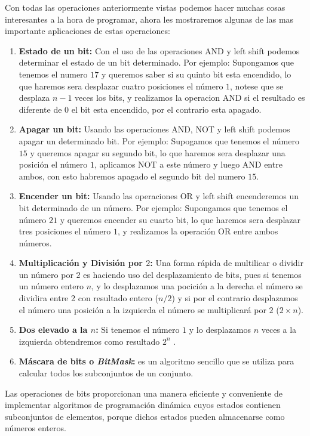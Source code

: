 Con todas las operaciones anteriormente vistas podemos hacer muchas cosas interesantes a la hora de
programar, ahora les mostraremos algunas de las mas importante aplicaciones de estas operaciones:

\begin{enumerate}
	\item \textbf{Estado de un bit:} Con el uso de las operaciones AND y left shift podemos determinar el estado de un bit determinado.
Por ejemplo: Supongamos que tenemos el numero $17$ y queremos saber si su quinto bit esta
encendido, lo que haremos sera desplazar cuatro posiciones el número $1$, notese que se desplaza $n-1$ veces los bits, y realizamos la operacion AND si el resultado es diferente de $0$ el bit esta encendido, por el contrario esta apagado.
	\item \textbf{Apagar un bit:} Usando las operaciones AND, NOT y left shift podemos apagar un determinado bit. Por ejemplo: Supogamos que tenemos el número $15$ y queremos apagar su segundo bit, lo que haremos sera
desplazar una posición el número $1$, aplicamos NOT a este número y luego AND entre ambos, con
esto habremos apagado el segundo bit del numero $15$.
	\item \textbf{Encender un bit:} Usando las operaciones OR y left shift encenderemos un bit determinado de un número. Por ejemplo: Supongamos que tenemos el número $21$ y queremos encender su cuarto bit, lo que haremos sera
desplazar tres posiciones el número $1$, y realizamos la operación OR entre ambos números.
	\item \textbf{Multiplicación y División por $2$:} Una forma rápida de multilicar o dividir un número por $2$ es haciendo uso del desplazamiento de
bits, pues si tenemos un número entero $n$, y lo desplazamos una pocición a la derecha el número se
dividira entre 2 con resultado entero ($n/2$) y si por el contrario desplazamos el número una posición
	a la izquierda el número se multiplicará por $2$ ($2 \times n$).
	\item \textbf{Dos elevado a la $n$:} Si tenemos el número $1$ y lo desplazamos $n$ veces a la izquierda obtendremos como resultado $2^n$ .
	\item \textbf{Máscara de bits o \emph{BitMask}:} es un algoritmo sencillo que se utiliza para calcular todos los subconjuntos
de un conjunto.
\end{enumerate}

Las operaciones de bits proporcionan una manera eficiente y conveniente de implementar algoritmos de programación dinámica cuyos estados contienen subconjuntos de elementos, porque dichos estados pueden almacenarse como números enteros.